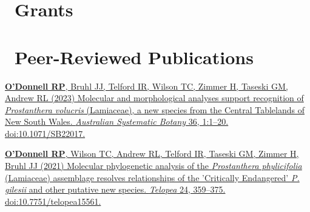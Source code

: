\documentclass[10,a4paper,]{awesome-cv}
\begin{document}
\hypertarget{grants}{%
\section{\texorpdfstring{\acvHeaderIconSep~Grants}{~Grants}}\label{grants}}

\begin{cventries}
    \vspace{-4.0mm}
\end{cventries}

\hypertarget{peer-reviewed-publications}{%
\section{\texorpdfstring{\acvHeaderIconSep~Peer-Reviewed
Publications}{~Peer-Reviewed Publications}}\label{peer-reviewed-publications}}

\href{https://doi.org/10.1071/SB22017}{\textbf{O'Donnell RP}, Bruhl JJ,
Telford IR, Wilson TC, Zimmer H, Taseski GM, Andrew RL (2023) Molecular
and morphological analyses support recognition of \emph{Prostanthera
volucris} (Lamiaceae), a new species from the Central Tablelands of New
South Wales. \emph{Australian Systematic Botany} 36, 1:1--20.
doi:10.1071/SB22017.}

\href{https://openjournals.library.sydney.edu.au/index.php/TEL/article/view/15561}{\textbf{O'Donnell
RP}, Wilson TC, Andrew RL, Telford IR, Taseski GM, Zimmer H, Bruhl JJ
(2021) Molecular phylogenetic analysis of the \emph{Prostanthera
phylicifolia} (Lamiaceae) assemblage resolves relationships of the
'Critically Endangered' \emph{P. gilesii} and other putative new
species. \emph{Telopea} 24, 359--375. doi:10.7751/telopea15561.}
\end{document}
